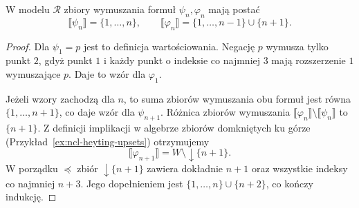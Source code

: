 \begin{lemat}
\label{lem:ncl-heyting-rn-truth-sets}
W modelu $\mathcal R$ zbiory wymuszania
formuł $\psi_n,\varphi_n$ mają postać
\[
 \llbracket\psi_n\rrbracket=\{1,\ldots,n\},
 \qquad
 \llbracket\varphi_n\rrbracket
 =\{1,\ldots,n-1\}\cup\{n+1\}.
\]
\end{lemat}
\begin{proof}
Dla $\psi_1=p$ jest to definicja wartościowania.
Negację $p$ wymusza tylko punkt $2$,
gdyż punkt $1$ i każdy punkt o indeksie co
najmniej $3$ mają rozszerzenie $1$ wymuszające $p$.
Daje to wzór dla $\varphi_1$.

Jeżeli wzory zachodzą dla $n$, to suma zbiorów
wymuszania obu formuł jest równa $\{1,\ldots,n+1\}$,
co daje wzór dla $\psi_{n+1}$.
Różnica zbiorów wymuszania
$\llbracket\varphi_n\rrbracket
\setminus\llbracket\psi_n\rrbracket$ to $\{n+1\}$.
Z definicji implikacji w algebrze
zbiorów domkniętych ku górze
(Przykład~\ref{ex:ncl-heyting-upsets}) otrzymujemy
\[
 \llbracket\varphi_{n+1}\rrbracket
 =W\setminus\downarrow\{n+1\}.
\]
W porządku $\preceq$ zbiór
$\downarrow\{n+1\}$ zawiera dokładnie $n+1$
oraz wszystkie indeksy co najmniej $n+3$.
Jego dopełnieniem jest
$\{1,\ldots,n\}\cup\{n+2\}$, co kończy indukcję.
\end{proof}

